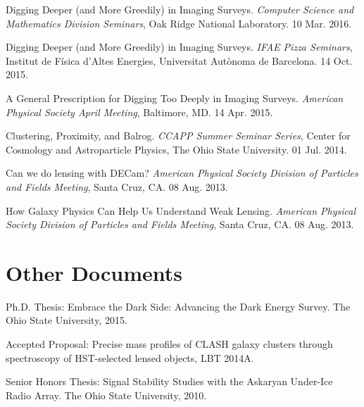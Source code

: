 \documentclass[12pt,a4paper,sans]{moderncv}	%
\begin{document}
\begin{achievements}
\item Digging Deeper (and More Greedily) in Imaging Surveys. \textit{Computer Science and Mathematics Division Seminars}, Oak Ridge National Laboratory. 10 Mar. 2016.
\item Digging Deeper (and More Greedily) in Imaging Surveys. \textit{IFAE Pizza Seminars}, Institut de F\'isica d'Altes Energies, Universitat Aut\`onoma de Barcelona. 14 Oct. 2015.
\item A General Prescription for Digging Too Deeply in Imaging Surveys. \textit{American Physical Society April Meeting}, Baltimore, MD. 14 Apr. 2015.
\item Clustering, Proximity, and Balrog. \textit{CCAPP Summer Seminar Series}, Center for Cosmology and Astroparticle Physics, The Ohio State University. 01 Jul. 2014.
\item Can we do lensing with DECam? \textit{American Physical Society Division of Particles and Fields Meeting}, Santa Cruz, CA. 08 Aug. 2013. 
\item How Galaxy Physics Can Help Us Understand Weak Lensing. \textit{American Physical Society Division of Particles and Fields Meeting}, Santa Cruz, CA. 08 Aug. 2013. 
\end{achievements}


\section{Other Documents}
\begin{achievements}
\item Ph.D. Thesis: Embrace the Dark Side: Advancing the Dark Energy Survey. The Ohio State University, 2015.
\item Accepted Proposal: Precise mass profiles of CLASH galaxy clusters through spectroscopy of HST-selected lensed objects, LBT 2014A.
\item Senior Honors Thesis: Signal Stability Studies with the Askaryan Under-Ice Radio Array. The Ohio State University, 2010.
\end{achievements}


\end{document}
